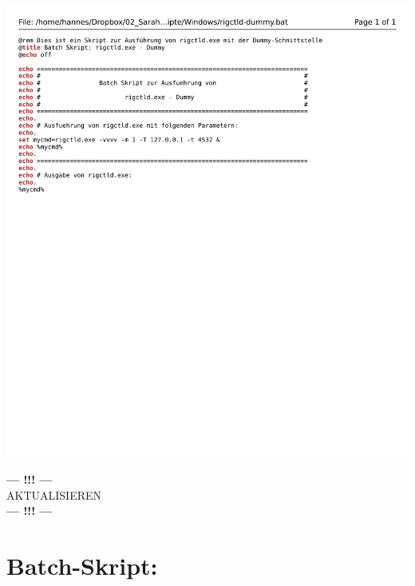 \begin{center}
	\includegraphics[width=1\textwidth]{./appendicies/rigctld-dummy}
\end{center}

\begin{center}
	\Large{\textbf{--- !!! ---}\\AKTUALISIEREN\\\textbf{--- !!! ---}}
\end{center}


\chapter{Batch-Skript: }
\label{chap:rotctlddummybat}

